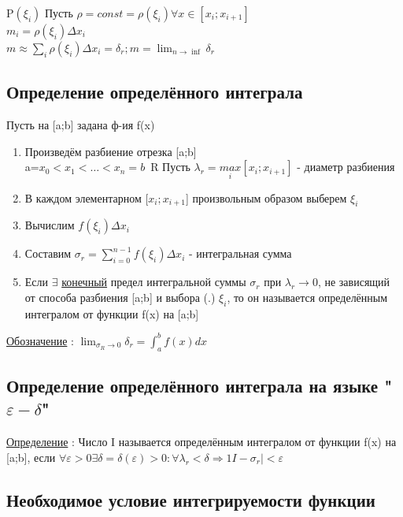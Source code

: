 \documentclass[12pt]{article}
\begin{document}
    P$(\xi_i)$ Пусть $\rho = const = \rho (\xi_i) \forall x \in [x_i;x_{i+1}]$\\
    $m_i=\rho(\xi_i) \Delta x_i$\\ $m \approx \sum_{i} \rho(\xi_i) \Delta x_i=\delta_r; m=\lim_{n \to \inf} \delta_r$

    \subsection{Определение определённого интеграла}
    \indent Пусть на [a;b] задана ф-ия f(x)\\
    \begin{enumerate}
        \item Произведём разбиение отрезка [a;b]\\
        a=$x_0<x_1<\dots<x_n=b\,$ R Пусть $\lambda_r = \underset{i}{max}[x_i;x_{i+1}]$ - диаметр разбиения
        \item В каждом элементарном [$x_i;x_{i+1}$] произвольным образом выберем $\xi_i$
        \item Вычислим $f(\xi_i)\Delta x_i$
        \item Составим $\sigma_r=\sum_{i=0}^{n-1} f(\xi_i) \Delta x_i$ - интегральная сумма
        \item Если $\exists$ \underline{конечный} предел интегральной суммы $\sigma_r$ при $\lambda_r \to 0$,
        не зависящий от способа разбиения [a;b] и выбора (.) $\xi_i$, то он называется определённым интегралом
        от функции f(x) на [a;b]
    \end{enumerate}

    \underline{Обозначение} : $\lim_{\sigma_R \to 0} \delta_r = \int_{a}^{b} f(x)dx$

    \subsection*{Определение определённого интеграла на языке "$\varepsilon - \delta$"}
    \underline{Определение} : Число I называется определённым интегралом от функции f(x)
    на [a;b], если $\forall \varepsilon>0 \exists \delta = \delta(\varepsilon)>0: 
    \forall \lambda_r < \delta \Rightarrow 1I-\sigma_r | <\varepsilon$

    \subsection{Необходимое условие интегрируемости функции}
\end{document}

